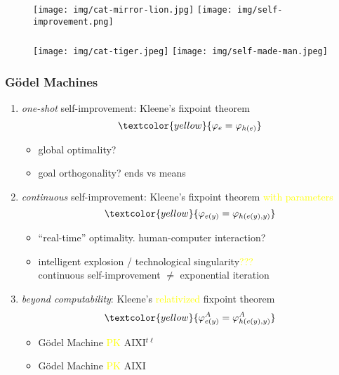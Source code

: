\documentclass[UTF8,11pt,colorlinks,compress,openany]{beamer}%
\begin{document}
\begin{frame}\frametitle{}
\begin{figure}
\texttt{[image: img/cat-mirror-lion.jpg]}
\texttt{[image: img/self-improvement.png]}
\end{figure}
\end{frame}

\begin{frame}\frametitle{}
\begin{figure}[H]
\texttt{[image: img/cat-tiger.jpeg]}
\texttt{[image: img/self-made-man.jpeg]}
\end{figure}
\end{frame}

\begin{frame}\frametitle{G\"odel Machines}
\begin{enumerate}
	\item \emph{one-shot} self-improvement: Kleene's fixpoint theorem
	\[\textcolor{yellow}{\varphi_e=\varphi_{h(e)}}\]
	\begin{itemize}
		\item global optimality?
		\item goal orthogonality? ends vs means
	\end{itemize}
	\item \emph{continuous} self-improvement: Kleene's fixpoint theorem \textcolor{yellow}{with parameters}
	\[\textcolor{yellow}{\varphi_{e(y)}=\varphi_{h(e(y),y)}}\]
	\begin{itemize}
		\item ``real-time'' optimality. human-computer interaction?
		\item intelligent explosion / technological singularity\textcolor{yellow}{???}\\
		continuous self-improvement $\ne$ exponential iteration
	\end{itemize}
	\item \emph{beyond computability}: Kleene's \textcolor{yellow}{relativized} fixpoint theorem
	\[\textcolor{yellow}{\varphi_{e(y)}^A=\varphi_{h(e(y),y)}^A}\]
	\begin{itemize}
		\item G\"odel Machine \textcolor{yellow}{PK} AIXI$^{t\ell}$
		\item G\"odel Machine \textcolor{yellow}{PK} AIXI
	\end{itemize}
\end{enumerate}
\end{frame}
\end{document}

